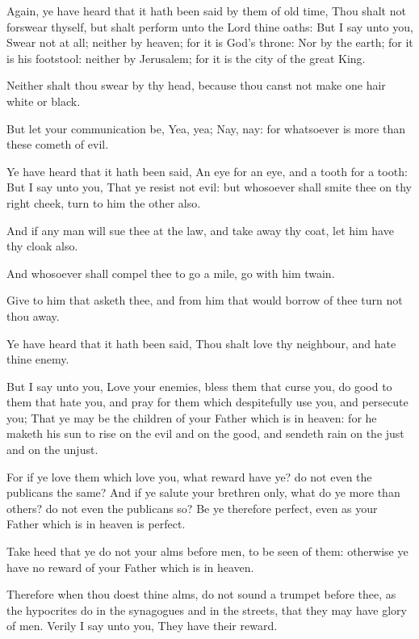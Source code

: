 \Verse Again, ye have heard that it hath been said by them of old time, Thou shalt not forswear thyself, but shalt perform unto the Lord thine oaths: \Verse But I say unto you, Swear not at all; neither by heaven; for it is God's throne: \Verse Nor by the earth; for it is his footstool: neither by Jerusalem; for it is the city of the great King.

\Verse Neither shalt thou swear by thy head, because thou canst not make one hair white or black.

\Verse But let your communication be, Yea, yea; Nay, nay: for whatsoever is more than these cometh of evil.

\Verse Ye have heard that it hath been said, An eye for an eye, and a tooth for a tooth: \Verse But I say unto you, That ye resist not evil: but whosoever shall smite thee on thy right cheek, turn to him the other also.

\Verse And if any man will sue thee at the law, and take away thy coat, let him have thy cloak also.

\Verse And whosoever shall compel thee to go a mile, go with him twain.

\Verse Give to him that asketh thee, and from him that would borrow of thee turn not thou away.

\Verse Ye have heard that it hath been said, Thou shalt love thy neighbour, and hate thine enemy.

\Verse But I say unto you, Love your enemies, bless them that curse you, do good to them that hate you, and pray for them which despitefully use you, and persecute you; \Verse That ye may be the children of your Father which is in heaven: for he maketh his sun to rise on the evil and on the good, and sendeth rain on the just and on the unjust.

\Verse For if ye love them which love you, what reward have ye? do not even the publicans the same?  \Verse And if ye salute your brethren only, what do ye more than others? do not even the publicans so?  \Verse Be ye therefore perfect, even as your Father which is in heaven is perfect.


\Chapter
\Verse Take heed that ye do not your alms before men, to be seen of them: otherwise ye have no reward of your Father which is in heaven.

\Verse Therefore when thou doest thine alms, do not sound a trumpet before thee, as the hypocrites do in the synagogues and in the streets, that they may have glory of men. Verily I say unto you, They have their reward.

